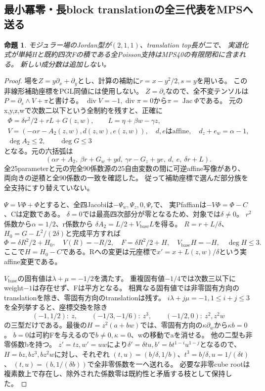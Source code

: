 \documentclass[a4paper,11pt]{ltjsarticle}
\newtheorem{proposition}{命題}[section]
\theoremstyle{definition}
\begin{document}
\subsection{最小冪零・長block translationの全三代表をMPSへ送る}
\begin{proposition}\label{prop:quartic-translated-minimal-mps}
モジュラー場のJordan型が$(2,1,1)$、translation top長が二で、
実退化式が単純Hと既約四次Fの積である全Poisson支持はMPS40の有限閉和に含まれる。
新しい成分数は追加しない。
\end{proposition}
\begin{proof}
場を$Z=y\partial_x+\partial_y$とし、計算の補助に$r=x-y^2/2,s=y$を用いる。
この非線形補助座標をPGL同値には使用しない。
$Z=\partial_s$なので、全不変テンソルは$P=\partial_s\wedge V+\pi$と書ける。
$\operatorname{div}V=-1,\operatorname{div}\pi=0$から$\pi=\operatorname{Jac}\Phi$である。
元のx,y,z,wで次数二以下という全制約を残すと、正確に
\[
\begin{gathered}
 \Phi=\delta r^2/2+rL+G(z,w),\qquad L=\eta+\beta w-\gamma z,\\
 V=(-\alpha r-A_2(z,w),d(z,w),e(z,w)),\quad
 d,e\text{はaffine},\quad d_z+e_w=\alpha-1,\\
 \deg A_2\le2,\qquad\deg G\le3
\end{gathered}
\]
となる。元の六括弧は
\[
 (\alpha r+A_2,\ \beta r+G_w+yd,\ \gamma r-G_z+ye,\ d,\ e,\ \delta r+L).
\]
全25parameterと元の完全90係数源の25自由変数の間に可逆affine写像があり、
両向きの逆積と全90係数の一致を確認した。
従って補助座標で選んだ部分族を全支持にすり替えていない。

$\Psi=V\Phi+\Phi$とすると、全四Jacobiは$-\Psi_w,\Psi_z,0,\Psi_r$で、
実Pfaffianは$-V\Phi=\Phi-C$、Cは定数である。
$\delta=0$では最高四次部分が零となるため、対象では$\delta\ne0$。
$r^2$係数から$\alpha=1/2$、r係数から
$\delta A_2=L/2+V_{\mathrm{base}}L$を得る。
$R=r+L/\delta$、$H_0=G-L^2/(2\delta)$と完成平方すれば
\[
 \Phi=\delta R^2/2+H_0,\quad V(R)=-R/2,\quad
 F=\delta R^2/2+H,\quad V_{\mathrm{base}}H=-H,\quad\deg H\le3.
\]
ここで$H=H_0-C$である。Rへの変更は元座標で$x'=x+L(z,w)/\delta$という実affine変更である。

$V_{\mathrm{base}}$の固有値は$\lambda+\mu=-1/2$を満たす。
重複固有値$-1/4$では次数三以下にweight$-1$は存在せず、Fは平方となる。
相異なる固有値では非零固有方向のtranslationを除き、零固有方向のtranslationは残す。
$i\lambda+j\mu=-1,1\le i+j\le3$を全列挙すると、座標交換を除き
\[
 (-1,1/2):\ z,\qquad(-1/3,-1/6):\ z^3,
 \qquad(-1/2,0):\ z^2,z^2w
\]
の三型だけである。最後の$H=z^2(a+bw)$では、零固有方向の$\kappa\partial_w$から$\kappa b=0$。
$b=0$は可約Fを与えるので$b\ne0,\kappa=0$、wの移動でaを消せる。
他の二型も非零係数bを持つ。
$z'=tz,w'=uw$により$\delta'=\delta tu,b'=bt^{1-i}u^{1-j}$となるので、
$H=bz,bz^3,bz^2w$に対し、それぞれ
$(t,u)=(b/\delta,1/b)$、$t^3=b/\delta,u=1/(\delta t)$、
$(t,u)=(b,1/(\delta b))$で全非零係数を一へ送れる。
必要な非零cube rootは複素数上で存在し、除外された係数零は既約性と矛盾する枝として保持した。


\end{proof}
\end{document}
